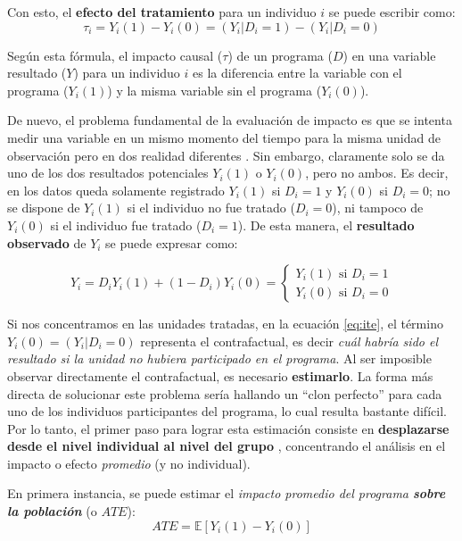 \documentclass[../../main.tex]{subfiles}
\begin{document}
Con esto, el \textbf{efecto del tratamiento} para un individuo \(i\) se puede escribir como:
\begin{equation}
    \tau_i = Y_i(1) - Y_i(0) = (Y_i|D_i=1) - (Y_i|D_i=0)
    \label{eq:ite} %
\end{equation}

Según esta fórmula, el impacto causal (\(\tau\)) de un programa (\(D\)) en una variable resultado (\(Y\)) para un individuo \(i\) es la diferencia entre la variable con el programa (\(Y_i(1)\)) y la misma variable sin el programa (\(Y_i(0)\)). 

De nuevo, el problema fundamental de la evaluación de impacto es que se intenta medir una variable en un mismo momento del tiempo para la misma unidad de observación pero en dos realidad diferentes \cite{gertler-2016}. Sin embargo, claramente solo se da uno de los dos resultados potenciales \(Y_i(1)\) o \(Y_i(0)\), pero no ambos. Es decir, en los datos queda solamente registrado \(Y_i(1)\) si \(D_i=1\) y \(Y_i(0)\) si \(D_i=0\); no se dispone de \(Y_i(1)\) si el individuo no fue tratado (\(D_i=0\)), ni tampoco de \(Y_i(0)\) si el individuo fue tratado (\(D_i=1\)). De esta manera, el \textbf{resultado observado} de \(Y_i\) se puede expresar como:

\begin{equation}
    Y_i = D_i Y_i(1) + (1-D_i)Y_i(0) =
    \begin{cases}
        Y_i(1) \text{ si } D_i=1 \\
        Y_i(0) \text{ si } D_i=0
    \end{cases}
    \label{eq:observed-result}
\end{equation}

Si nos concentramos en las unidades tratadas, en la ecuación \ref{eq:ite}, el término \(Y_i(0) = (Y_i|D_i=0)\) representa el contrafactual, es decir \textit{cuál habría sido el resultado si la unidad no hubiera participado en el programa}. Al ser imposible observar directamente el contrafactual, es necesario \textbf{estimarlo}. La forma más directa de solucionar este problema sería hallando un ``clon perfecto'' para cada uno de los individuos participantes del programa, lo cual resulta bastante difícil. Por lo tanto, el primer paso para lograr esta estimación consiste en \textbf{desplazarse desde el nivel individual al nivel del grupo} \cite{gertler-2016}, concentrando el análisis en el impacto o efecto \textit{promedio} (y no individual).

En primera instancia, se puede estimar el \textit{impacto promedio del programa \textbf{sobre la población}} (o \(ATE\)):
\begin{equation}
    ATE = \mathbb{E}\left[Y_i(1)-Y_i(0)\right]
\end{equation}
\end{document}
